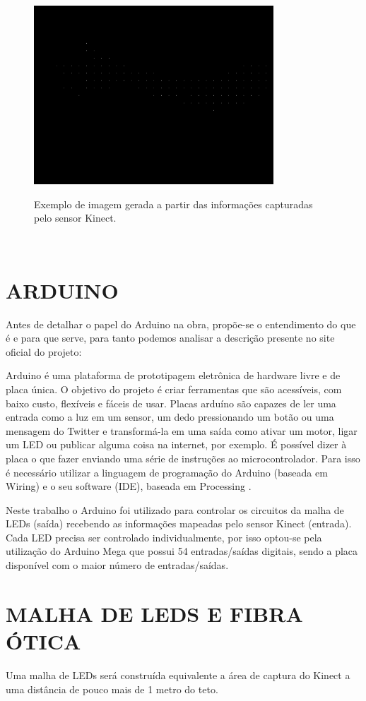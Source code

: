 \begin{figure}[H]
    \centering
    \caption{Exemplo de imagem gerada a partir  das informações capturadas  pelo sensor Kinect.}
	\vspace*{0,2cm}
    \includegraphics[width=0.8\textwidth]{./04-figuras/kinect_exemplo}
    \label{fig:kinect_exemplo}
\end{figure}
\vspace*{-0,9cm}
{\raggedright {}}\\


\section{ARDUINO}

Antes de detalhar o papel do Arduino na obra, propõe-se o entendimento do que é e para que serve, para tanto podemos analisar a descrição presente no site oficial do projeto:

\begin{citacao}
Arduino é uma plataforma de prototipagem eletrônica de hardware livre e de placa única. O objetivo do projeto é criar ferramentas que são acessíveis, com baixo custo, flexíveis e fáceis de usar. Placas arduíno são capazes de ler uma entrada como a luz em um sensor, um dedo pressionando um botão ou uma mensagem do Twitter e transformá-la em uma saída como ativar um motor, ligar um LED ou publicar alguma coisa na internet, por exemplo. É possível dizer à placa o que fazer enviando uma série de instruções ao microcontrolador. Para isso é necessário utilizar a linguagem de programação do Arduino (baseada em Wiring) e o seu software (IDE), baseada em Processing \cite{arduino}. 
\end{citacao}

Neste trabalho o Arduino foi utilizado para controlar os circuitos da malha de LEDs (saída) recebendo as informações mapeadas pelo sensor Kinect (entrada). Cada LED precisa ser controlado individualmente, por isso optou-se pela utilização do Arduino Mega que possui 54 entradas/saídas digitais, sendo a placa disponível com o maior número de entradas/saídas.


\section{MALHA DE LEDS E FIBRA ÓTICA}

Uma malha de LEDs será construída equivalente a área de captura do Kinect a uma distância de pouco mais de 1 metro do teto.
